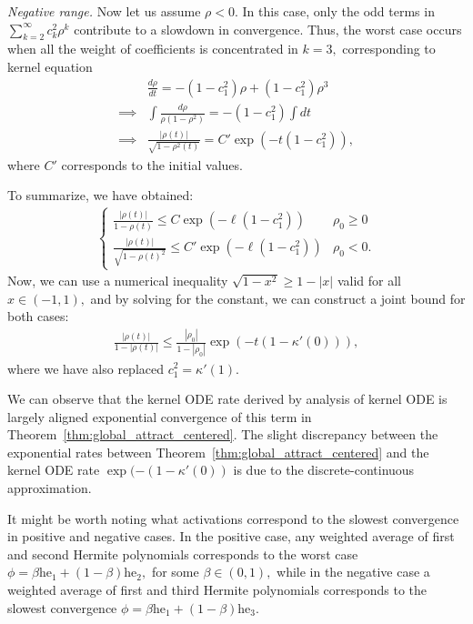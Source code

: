 \documentclass[twoside]{article}
\newcommand{\he}{\mathrm{he}}
\theoremstyle{definition}
\begin{document}
\textit{Negative range.}
Now let us assume $\rho<0.$ In this case, only the odd terms in $\sum_{k=2}^\infty c_k^2 \rho^k$ contribute to a slowdown in convergence. Thus, the worst case occurs when all the weight of coefficients is concentrated in $k=3,$ corresponding to kernel equation 
\begin{align*}
&\frac{d\rho}{dt} = -(1-c_1^2)\rho + (1-c_1^2) \rho^3\\
\implies    &\int \frac{d\rho}{\rho(1-\rho^2)} = -(1-c_1^2)\int dt \\
\implies &\frac{|\rho(t)|}{\sqrt{1-\rho^2(t)}} = C' \exp(-t(1-c_1^2)),
\end{align*}
where $C'$ corresponds to the initial values. 

To summarize, we have obtained:
\begin{align*}
    \begin{cases}
        \frac{|\rho(t)|}{1-\rho(t)} \le C \exp(-\ell(1-c_1^2)) & \rho_0 \ge 0\\
        \frac{|\rho(t)|}{\sqrt{1-\rho(t)^2}}\le C' \exp(-\ell(1-c_1^2)) & \rho_0 < 0.
    \end{cases}
\end{align*}
Now, we can use a numerical inequality $\sqrt{1-x^2} \ge 1-|x|$ valid for all $x\in(-1,1),$ and by solving for the constant, we can construct a joint bound for both cases:
\begin{align*}
    \frac{|\rho(t)|}{1-|\rho(t)|} \le \frac{|\rho_0|}{1-|\rho_0|} \exp(-t (1-\kappa'(0))), 
\end{align*}
where we have also replaced $c_1^2=\kappa'(1).$  

We can observe that the kernel ODE rate derived by analysis of kernel ODE is largely aligned exponential convergence of this term in Theorem~\ref{thm:global_attract_centered}. The slight discrepancy between the exponential rates between Theorem~\ref{thm:global_attract_centered} and the kernel ODE rate $\exp(-(1-\kappa'(0))$ is due to the discrete-continuous approximation. 

It might be worth noting what activations correspond to the slowest convergence in positive and negative cases. In the positive case, any weighted average of first and second Hermite polynomials corresponds to the worst case $\phi = \beta \he_1 + (1-\beta) \he_2,$ for some $\beta \in(0,1),$ while in the negative case a weighted average of first and third Hermite polynomials corresponds to the slowest convergence $\phi = \beta \he_1 + (1-\beta)\he_3. $  
\end{document}
